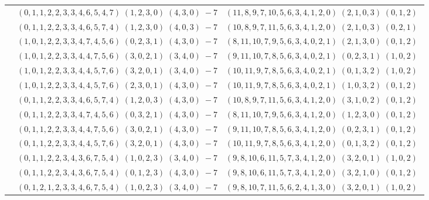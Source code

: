\documentclass[11pt]{article}
\begin{document}
\begin{longtable}[l]{|c|c|c|}
 \cline{2-3} 
 & $(0 ,1 ,1 ,2 ,2 ,3 ,3 ,4 ,6 ,5 ,4 ,7) \;(1 ,2 ,3 ,0) \;(4 ,3 ,0) \;-7$ & $(11 ,8 ,9 ,7 ,10 ,5 ,6 ,3 ,4 ,1 ,2 ,0) \;(2 ,1 ,0 ,3) \;(0 ,1 ,2) \;$\\ 
 \cline{2-3} 
 & $(0 ,1 ,1 ,2 ,2 ,3 ,3 ,4 ,6 ,5 ,7 ,4) \;(1 ,2 ,3 ,0) \;(4 ,0 ,3) \;-7$ & $(10 ,8 ,9 ,7 ,11 ,5 ,6 ,3 ,4 ,1 ,2 ,0) \;(2 ,1 ,0 ,3) \;(0 ,2 ,1) \;$\\ 
 \cline{2-3} 
 & $(1 ,0 ,1 ,2 ,2 ,3 ,3 ,4 ,7 ,4 ,5 ,6) \;(0 ,2 ,3 ,1) \;(4 ,3 ,0) \;-7$ & $(8 ,11 ,10 ,7 ,9 ,5 ,6 ,3 ,4 ,0 ,2 ,1) \;(2 ,1 ,3 ,0) \;(0 ,1 ,2) \;$\\ 
 \cline{2-3} 
 & $(1 ,0 ,1 ,2 ,2 ,3 ,3 ,4 ,4 ,7 ,5 ,6) \;(3 ,0 ,2 ,1) \;(3 ,4 ,0) \;-7$ & $(9 ,11 ,10 ,7 ,8 ,5 ,6 ,3 ,4 ,0 ,2 ,1) \;(0 ,2 ,3 ,1) \;(1 ,0 ,2) \;$\\ 
 \cline{2-3} 
 & $(1 ,0 ,1 ,2 ,2 ,3 ,3 ,4 ,4 ,5 ,7 ,6) \;(3 ,2 ,0 ,1) \;(3 ,4 ,0) \;-7$ & $(10 ,11 ,9 ,7 ,8 ,5 ,6 ,3 ,4 ,0 ,2 ,1) \;(0 ,1 ,3 ,2) \;(1 ,0 ,2) \;$\\ 
 \cline{2-3} 
 & $(1 ,0 ,1 ,2 ,2 ,3 ,3 ,4 ,4 ,5 ,7 ,6) \;(2 ,3 ,0 ,1) \;(4 ,3 ,0) \;-7$ & $(10 ,11 ,9 ,7 ,8 ,5 ,6 ,3 ,4 ,0 ,2 ,1) \;(1 ,0 ,3 ,2) \;(0 ,1 ,2) \;$\\ 
 \cline{2-3} 
 & $(0 ,1 ,1 ,2 ,2 ,3 ,3 ,4 ,6 ,5 ,7 ,4) \;(1 ,2 ,0 ,3) \;(4 ,3 ,0) \;-7$ & $(10 ,8 ,9 ,7 ,11 ,5 ,6 ,3 ,4 ,1 ,2 ,0) \;(3 ,1 ,0 ,2) \;(0 ,1 ,2) \;$\\ 
 \cline{2-3} 
 & $(0 ,1 ,1 ,2 ,2 ,3 ,3 ,4 ,7 ,4 ,5 ,6) \;(0 ,3 ,2 ,1) \;(4 ,3 ,0) \;-7$ & $(8 ,11 ,10 ,7 ,9 ,5 ,6 ,3 ,4 ,1 ,2 ,0) \;(1 ,2 ,3 ,0) \;(0 ,1 ,2) \;$\\ 
 \cline{2-3} 
 & $(0 ,1 ,1 ,2 ,2 ,3 ,3 ,4 ,4 ,7 ,5 ,6) \;(3 ,0 ,2 ,1) \;(4 ,3 ,0) \;-7$ & $(9 ,11 ,10 ,7 ,8 ,5 ,6 ,3 ,4 ,1 ,2 ,0) \;(0 ,2 ,3 ,1) \;(0 ,1 ,2) \;$\\ 
 \cline{2-3} 
 & $(0 ,1 ,1 ,2 ,2 ,3 ,3 ,4 ,4 ,5 ,7 ,6) \;(3 ,2 ,0 ,1) \;(4 ,3 ,0) \;-7$ & $(10 ,11 ,9 ,7 ,8 ,5 ,6 ,3 ,4 ,1 ,2 ,0) \;(0 ,1 ,3 ,2) \;(0 ,1 ,2) \;$\\ 
 \cline{2-3} 
 & $(0 ,1 ,1 ,2 ,2 ,3 ,4 ,3 ,6 ,7 ,5 ,4) \;(1 ,0 ,2 ,3) \;(3 ,4 ,0) \;-7$ & $(9 ,8 ,10 ,6 ,11 ,5 ,7 ,3 ,4 ,1 ,2 ,0) \;(3 ,2 ,0 ,1) \;(1 ,0 ,2) \;$\\ 
 \cline{2-3} 
 & $(0 ,1 ,1 ,2 ,2 ,3 ,4 ,3 ,6 ,7 ,5 ,4) \;(0 ,1 ,2 ,3) \;(4 ,3 ,0) \;-7$ & $(9 ,8 ,10 ,6 ,11 ,5 ,7 ,3 ,4 ,1 ,2 ,0) \;(3 ,2 ,1 ,0) \;(0 ,1 ,2) \;$\\ 
 \cline{2-3} 
 & $(0 ,1 ,2 ,1 ,2 ,3 ,3 ,4 ,6 ,7 ,5 ,4) \;(1 ,0 ,2 ,3) \;(3 ,4 ,0) \;-7$ & $(9 ,8 ,10 ,7 ,11 ,5 ,6 ,2 ,4 ,1 ,3 ,0) \;(3 ,2 ,0 ,1) \;(1 ,0 ,2) \;$\\ 

\end{longtable}
\end{document}
